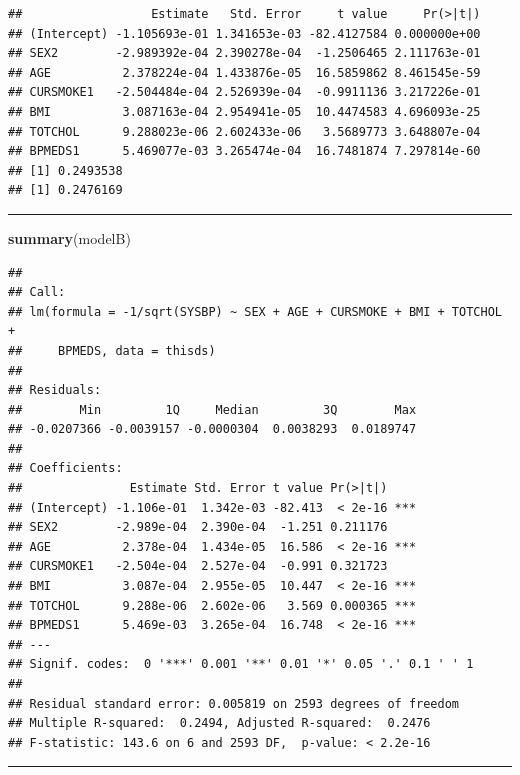\documentclass[]{article}
\newenvironment{Shaded}{\begin{snugshade}}{\end{snugshade}}
\newcommand{\KeywordTok}[1]{\textcolor[rgb]{0.13,0.29,0.53}{\textbf{#1}}}
\newcommand{\NormalTok}[1]{#1}
\begin{document}
\begin{verbatim}
##                  Estimate   Std. Error     t value     Pr(>|t|)
## (Intercept) -1.105693e-01 1.341653e-03 -82.4127584 0.000000e+00
## SEX2        -2.989392e-04 2.390278e-04  -1.2506465 2.111763e-01
## AGE          2.378224e-04 1.433876e-05  16.5859862 8.461545e-59
## CURSMOKE1   -2.504484e-04 2.526939e-04  -0.9911136 3.217226e-01
## BMI          3.087163e-04 2.954941e-05  10.4474583 4.696093e-25
## TOTCHOL      9.288023e-06 2.602433e-06   3.5689773 3.648807e-04
## BPMEDS1      5.469077e-03 3.265474e-04  16.7481874 7.297814e-60
## [1] 0.2493538
## [1] 0.2476169
\end{verbatim}

\begin{center}\rule{0.5\linewidth}{\linethickness}\end{center}

\footnotesize

\begin{Shaded}
\begin{Highlighting}[]
\KeywordTok{summary}\NormalTok{(modelB)}
\end{Highlighting}
\end{Shaded}

\begin{verbatim}
## 
## Call:
## lm(formula = -1/sqrt(SYSBP) ~ SEX + AGE + CURSMOKE + BMI + TOTCHOL + 
##     BPMEDS, data = thisds)
## 
## Residuals:
##        Min         1Q     Median         3Q        Max 
## -0.0207366 -0.0039157 -0.0000304  0.0038293  0.0189747 
## 
## Coefficients:
##               Estimate Std. Error t value Pr(>|t|)    
## (Intercept) -1.106e-01  1.342e-03 -82.413  < 2e-16 ***
## SEX2        -2.989e-04  2.390e-04  -1.251 0.211176    
## AGE          2.378e-04  1.434e-05  16.586  < 2e-16 ***
## CURSMOKE1   -2.504e-04  2.527e-04  -0.991 0.321723    
## BMI          3.087e-04  2.955e-05  10.447  < 2e-16 ***
## TOTCHOL      9.288e-06  2.602e-06   3.569 0.000365 ***
## BPMEDS1      5.469e-03  3.265e-04  16.748  < 2e-16 ***
## ---
## Signif. codes:  0 '***' 0.001 '**' 0.01 '*' 0.05 '.' 0.1 ' ' 1
## 
## Residual standard error: 0.005819 on 2593 degrees of freedom
## Multiple R-squared:  0.2494, Adjusted R-squared:  0.2476 
## F-statistic: 143.6 on 6 and 2593 DF,  p-value: < 2.2e-16
\end{verbatim}

\normalsize

\begin{center}\rule{0.5\linewidth}{\linethickness}\end{center}
\end{document}
